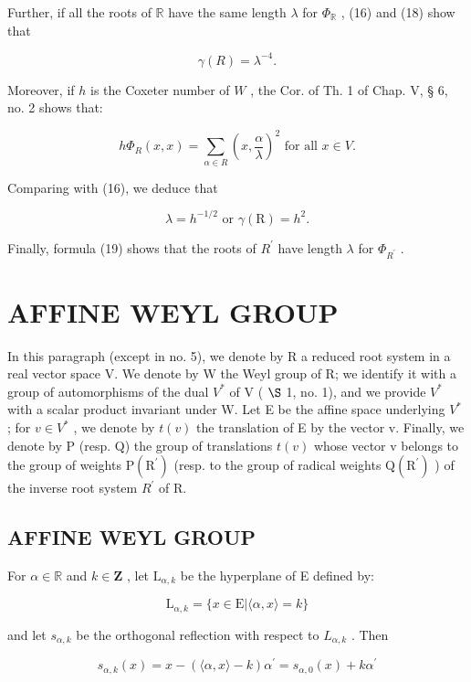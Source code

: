Further, if all the roots of \(\mathbb{R}\) have the same length \(\lambda\) for \(\varPhi_{\mathbb{R}}\) , (16) and (18) show that

\[
\gamma (R) = \lambda^ {- 4}.\tag{20}
\]

Moreover, if \(h\) is the Coxeter number of \(W\) , the Cor. of Th. 1 of Chap. V, § 6, no. 2 shows that:

\[
h \Phi_ {R} (x, x) = \sum_ {\alpha \in R} \left(x, \frac {\alpha}{\lambda}\right) ^ {2} \text {   for   all   } x \in V.
\]

Comparing with (16), we deduce that

\[
\lambda = h ^ {- 1 / 2} \text { or } \gamma (\mathrm{R}) = h ^ {2}.\tag{21}
\]

Finally, formula (19) shows that the roots of \(R^{\prime}\) have length \(\lambda\) for \(\Phi_{R^{\prime}}\) .

\section{AFFINE WEYL GROUP}

In this paragraph (except in no. 5), we denote by R a reduced root system in a real vector space V. We denote by W the Weyl group of R; we identify it with a group of automorphisms of the dual \(V^{*}\) of V ( \(\S\) 1, no. 1), and we provide \(V^{*}\) with a scalar product invariant under W. Let E be the affine space underlying \(V^{*}\) ; for \(v \in V^{*}\) , we denote by \(t(v)\) the translation of E by the vector v. Finally, we denote by P (resp. Q) the group of translations \(t(v)\) whose vector v belongs to the group of weights \(\mathrm{P}(\mathrm{R}^{\prime})\) (resp. to the group of radical weights \(\mathrm{Q}(\mathrm{R}^{\prime})\) ) of the inverse root system \(R^{\prime}\) of R.

\subsection{AFFINE WEYL GROUP}

For \(\alpha \in \mathbb{R}\) and \(k\in \mathbf{Z}\) , let \(\mathrm{L}_{\alpha ,k}\) be the hyperplane of E defined by:

\[
\mathrm{L} _ {\alpha , k} = \{x \in \mathrm{E} | \langle \alpha , x \rangle = k \}
\]

and let \(s_{\alpha, k}\) be the orthogonal reflection with respect to \(L_{\alpha, k}\) . Then

\[
s _ {\alpha , k} (x) = x - (\langle \alpha , x \rangle - k) \alpha^ {\prime} = s _ {\alpha , 0} (x) + k \alpha^ {\prime}
\]

